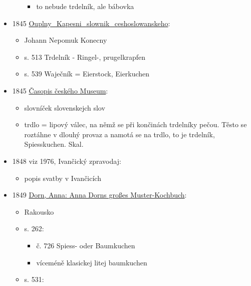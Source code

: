 \begin{itemize}
\begin{itemize}
    \begin{itemize}
    \tightlist
    \item
      to nebude trdelník, ale bábovka
    \end{itemize}
  \end{itemize}
\item
  1845
  \href{https://www.google.cz/books/edition/Ouplny_Kapesni_slownik_ceshoslowanskeho/i8dUAAAAcAAJ?hl=cs&gbpv=1&dq=trdeln\%C3\%ADk&pg=PA513&printsec=frontcover}{Ouplny\_Kapesni\_slownik\_ceshoslowanskeho}:

  \begin{itemize}
  \tightlist
  \item
    Johann Nepomuk Konecny
  \item
    s. 513 Trdelník - Ringel-, prugelkrapfen
  \item
    s. 539 Waječník = Eierstock, Eierkuchen
  \end{itemize}
\item
  1845
  \href{https://ceskadigitalniknihovna.cz/view/uuid:f683dda0-81be-11de-9a7b-000d606f5dc6?page=uuid:5a5cbb90-7ff7-11de-8619-000d606f5dc6&fulltext=trdeln\%C3\%ADk\%20OR\%20trdeln\%C3\%ADky\%20OR\%20trdeln\%C3\%ADku\%20&source=cbvk}{Časopis
  českého Museum}:

  \begin{itemize}
  \tightlist
  \item
    slovníček slovenskejch slov
  \item
    trdlo = lipový válec, na němž se při končinách trdelníky pečou.
    Těsto se roztáhne v dlouhý provaz a namotá se na trdlo, to je
    trdelník, Spiesskuchen. Skal.
  \end{itemize}
\item
  1848 viz 1976, Ivančický zpravodaj:

  \begin{itemize}
  \tightlist
  \item
    popis svatby v Ivančicích
  \end{itemize}
\item
  1849
  \href{https://www.digital.wienbibliothek.at/wbrobv/content/titleinfo/2739695}{Dorn,
  Anna: Anna Dorn\textquotesingle s großes Muster-Kochbuch}:

  \begin{itemize}
  \tightlist
  \item
    Rakousko
  \item
    s. 262:

    \begin{itemize}
    \tightlist
    \item
      č. 726 Spiess- oder Baumkuchen
    \item
      víceméně klasickej litej baumkuchen
    \end{itemize}
  \item
    s. 531:


\end{itemize}
\end{itemize}
